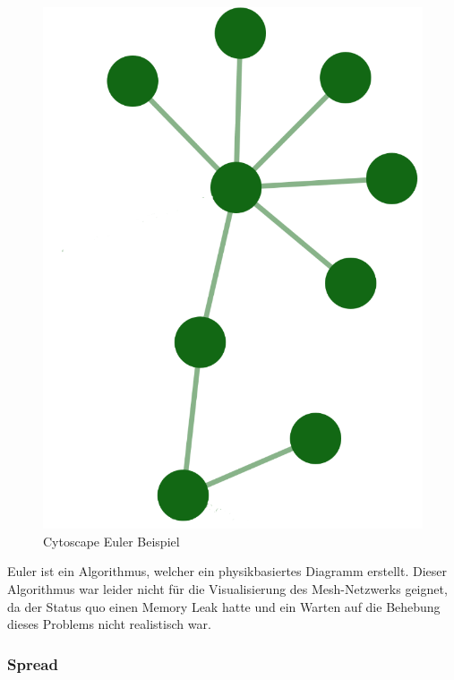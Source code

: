 \begin{figure}[H] 
    \begin{center}
        \includegraphics[scale=0.5]{images/cytoscape-euler-example.png}
        \caption{Cytoscape Euler Beispiel \cite{cytoscape_euler}}
        \label{abb:cytoscape-spread-example}
    \end{center}    
\end{figure}

Euler ist ein Algorithmus, welcher ein physikbasiertes Diagramm erstellt.
Dieser Algorithmus war leider nicht für die Visualisierung des Mesh-Netzwerks geignet, da der Status quo einen Memory Leak hatte und ein Warten auf die Behebung dieses Problems nicht realistisch war.

\subsubsection{Spread}\label{sec:cytoscape-spread}

